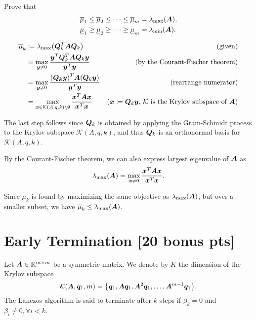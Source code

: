 \documentclass[twoside,10pt]{article}
\begin{document}
Prove that
\begin{align}
  \overline{\mu}_{1} \leq \overline{\mu}_{2} \leq \dots \leq \overline{\mu}_m &= \lambda_{\max} \left(\mtx{A}\right),\\
  \underline{\mu}_{1} \geq \underline{\mu}_{2} \geq \dots \geq \underline{\mu}_m &= \lambda_{\min} \left(\mtx{A}\right).
\end{align}

\begin{align*}
  \overline{\mu}_k &\coloneqq \lambda_{\max} \left(\mtx{Q}_k^T \mtx{A} \mtx{Q}_k\right)&\text{(given)}\\
  &= \max\limits_{\vct{y} \neq 0}\dfrac{\vct{y}^T\mtx{Q}_k^T \mtx{A}\mtx{Q}_k\vct{y}}{\vct{y}^T\vct{y}}&\text{(by the Courant-Fischer theorem)}\\
  &= \max\limits_{\vct{y} \neq 0}\dfrac{\left(\mtx{Q_k}\vct{y}\right)^T \mtx{A}\left(\mtx{Q}_k\vct{y}\right)}{\vct{y}^T\vct{y}}&\text{(rearrange numerator)}\\
  &= \max\limits_{\vct{x} \in \mathcal{K}(A,q,k) \setminus \emptyset}\dfrac{\vct{x}^T \mtx{A}\vct{x}}{\vct{x}^T\vct{x}}&\text{($\vct{x} \coloneqq \mtx{Q}_k\vct{y}$, $\mathcal{K}$ is the Krylov subspace of $\mtx{A}$)}\\
\end{align*}

The last step follows since $\bm{Q}_k$ is obtained by applying the Gram-Schmidt process to the Krylov subspace $\mathcal{K}(A,q,k)$, and thus $\bm{Q}_k$ is an orthonormal basis for $\mathcal{K}(A,q,k)$.

By the Courant-Fischer theorem, we can also express largest eigenvalue of $\bm{A}$ as
$$\lambda_{\max} \left(\mtx{A}\right) = \max\limits_{\vct{x} \neq 0}\dfrac{\vct{x}^T\mtx{A}\vct{x}}{\vct{x}^T\vct{x}}.$$

Since $\overline{\mu}_k$ is found by maximizing the same objective as $\lambda_{\max} \left(\mtx{A}\right)$, but over a smaller subset, we have $\overline{\mu}_k \leq \lambda_{\max} \left(\mtx{A}\right)$.

\section{Early Termination [20 bonus pts]}
Let $\bm{A} \in \mathbb{R}^{m \times m}$ be a symmetric matrix. 
We denote by $K$ the dimension of the Krylov subspace 
\begin{equation}
  \mathcal{K}\left(\mtx{A}, \vct{q}_1, m\right) = \left\{\vct{q}_1, \mtx{A}\vct{q}_1, \mtx{A}^2 \vct{q}_1, \ldots, \mtx{A}^{m - 1} \vct{q}_1\right\}.
\end{equation}
The Lanczos algorithm is said to terminate after $k$ steps if $\beta_{k} = 0$ and $\beta_{i} \neq 0, \forall i < k$.
\end{document}
